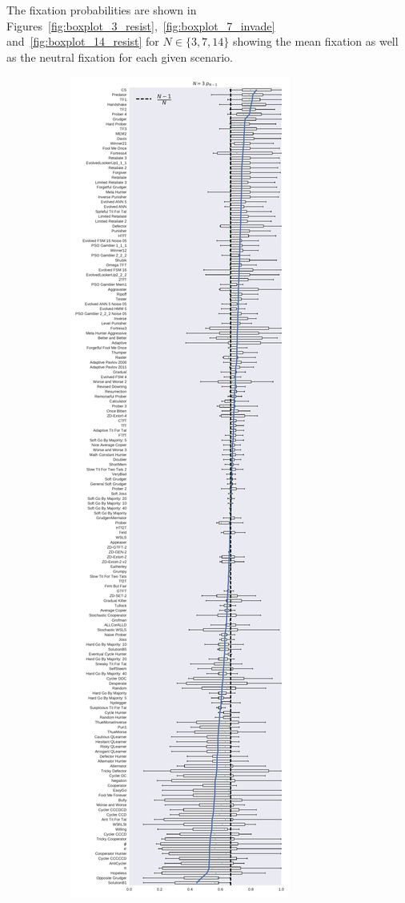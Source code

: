 \documentclass[10pt,journal]{IEEEtran}
\begin{document}
The fixation probabilities are shown in
Figures~\ref{fig:boxplot_3_resist},~\ref{fig:boxplot_7_invade}
and~\ref{fig:boxplot_14_resist} for \(N\in\{3, 7, 14\}\) showing the mean
fixation as well as the neutral fixation for each given scenario.


\begin{figure}[!hbtp]
    \centering
    \begin{subfigure}{.3\columnwidth}
        \centering
        \includegraphics[width=\columnwidth]{img/boxplot_3_resist.pdf}

\end{subfigure}
\end{figure}
\end{document}
